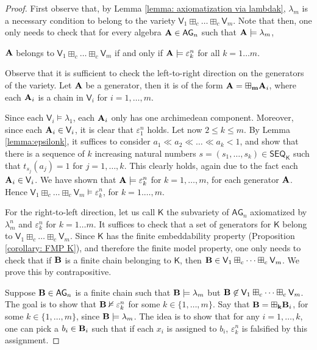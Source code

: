 \documentclass{amsart}
\theoremstyle{definition}
\numberwithin{equation}{section}
\newcommand{\alg}[1]{{\textbf{\upshape #1}}}  %
\newcommand{\vv}[1]{\mathsf {#1}}
\newcommand{\BG}{\vv{AG}}
\begin{document}
\begin{proof}
	First observe that, by Lemma \ref{lemma: axiomatization via lambdak}, $\lambda_m$ is a necessary condition to belong to the variety $\vv V_1 \boxplus_c \dots \boxplus_c \vv V_m$. Note that then, one only needs to check that for every algebra $\alg A \in \BG_n$ such that $\alg A \models \lambda_m$, 
	\begin{center}
		$\alg A$ belongs to $\vv V_1 \boxplus_c \dots \boxplus_c \vv V_m$ if and only if $\alg A \models \varepsilon_k^n$ for all $k = 1 \ldots m$. 
	\end{center}
	Observe that it is sufficient to check the left-to-right direction on the generators of the variety. Let $\alg A$ be a generator, then it is of the form $\alg A= \boxplus_{\bf m}\alg A_i$, where each $\alg A_i$ is a chain in $\vv V_i$ for $i=1, \dots , m$. 
	
	Since each $\vv V_i \models \lambda_1$, each $\alg A_i$ only has one archimedean component. Moreover, since each $\alg A_i \in \vv V_i$, it is clear that $\varepsilon_1^n$ holds.
	Let now $2 \leq k \leq m$. By Lemma \ref{lemma:epsilonk}, it suffices to consider $a_1 \ll a_2 \ll \dots \ll a_k < 1$, and show that there is a sequence of $k$ increasing natural numbers $s=(s_1, \dots, s_k)\in \vv {SEQ_K}$ such that $t_{s_j}(a_j)=1$ for $j=1, \dots , k$. This clearly holds, again due to the fact each $\alg A_i \in \vv V_i$. We have shown that $\alg A \models \varepsilon_k^n$ for $k=1, \dots, m$, for each generator $\alg A$. Hence
	 $\vv V_1 \boxplus_c \dots \boxplus_c \vv V_m\models \varepsilon_k^n$, for $k=1. \dots, m$.
	
	For the right-to-left direction, let us call $\vv K$ the subvariety of $\BG_n$ axiomatized by $\lambda_m^n$ and $\varepsilon_k^n$ for $k = 1 \ldots m$. It suffices to check that a set of generators for $\vv K$ belong to $\vv V_1 \boxplus_c \dots \boxplus_c \vv V_m$. Since $\vv K$ has the finite embeddability property (Proposition \ref{corollary: FMP K}), and therefore the finite model property, one only needs to check that if $\alg B$ is a finite chain belonging to $\vv K$, then $\alg B \in \vv V_1 \boxplus_c \dots \boxplus_c \vv V_m$. We prove this by contrapositive.
	
 Suppose $\alg B \in \BG_n$ is a finite chain such that $\alg B \models \lambda_m$ but $\alg B \not \in \vv V_1 \boxplus_c \dots \boxplus_c \vv V_m$. The goal is to show that $\alg B \nvDash \varepsilon_k^n$ for some $k \in \{1, \ldots, m\}$. Say that $\alg B = \boxplus_{\bf k} \alg B_i$, for some $k \in \{1, \ldots, m\}$, since $\alg B \models \lambda_m$. The idea is to show that for any $i= 1, \dots, k$, one can pick a $b_i \in \alg B_i$ such that if each $x_i$ is assigned to $b_i$, $\varepsilon_k^n$ is falsified by this assignment.
	

\end{proof}
\end{document}
